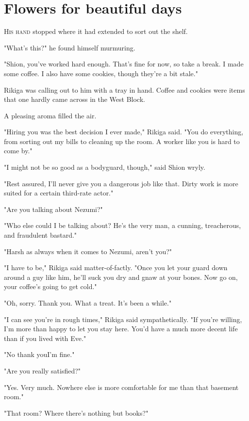 
\chapter{Flowers for beautiful days}

\lettrine{H}{is hand} stopped where it had extended to sort out the shelf.

"What's this?" he found himself murmuring.

"Shion, you've worked hard enough. That's fine for now, so take a break. I made some coffee. I also have some cookies, though they're a bit stale."

Rikiga was calling out to him with a tray in hand. Coffee and cookies were items that one hardly came across in the West Block.

A pleasing aroma filled the air.

"Hiring you was the best decision I ever made," Rikiga said. "You do everything, from sorting out my bills to cleaning up the room. A worker like you is hard to come by."

"I might not be so good as a bodyguard, though," said Shion wryly.

"Rest assured, I'll never give you a dangerous job like that. Dirty work is more suited for a certain third-rate actor."

"Are you talking about Nezumi?"

"Who else could I be talking about? He's the very man, a cunning, treacherous, and fraudulent bastard."

"Harsh as always when it comes to Nezumi, aren't you?"

"I have to be," Rikiga said matter-of-factly. "Once you let your guard down around a guy like him, he'll suck you dry and gnaw at your bones. Now go on, your coffee's going to get cold."

"Oh, sorry. Thank you. What a treat. It's been a while."

"I can see you're in rough times," Rikiga said sympathetically. "If you're willing, I'm more than happy to let you stay here. You'd have a much more decent life than if you lived with Eve."

"No thank you\el I'm fine."

"Are you really satisfied?"

"Yes. Very much. Nowhere else is more comfortable for me than that basement room."

"That room? Where there's nothing but books?"

